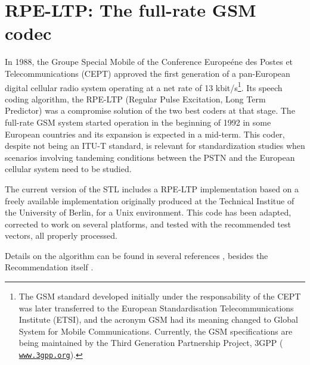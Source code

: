 \chapter{RPE-LTP: The full-rate GSM codec}

In 1988, the Groupe Special Mobile of the Conference Europe\'{e}ne
des Postes et Telecommunications (CEPT) approved the first
generation of a pan-European digital cellular radio system operating
at a net rate of 13 kbit/s\footnote{\SF The GSM standard developed
initially under the responsability of the CEPT was later transferred
to the European Standardisation Telecommunications Institute (ETSI),
and the acronym GSM had its meaning changed to Global System for
Mobile Communications. Currently, the GSM specifications are being
maintained by the Third Generation Partnership Project, 3GPP ({\tt
\url{www.3gpp.org}}).}. Its speech coding algorithm, the RPE-LTP
(Regular Pulse Excitation, Long Term Predictor) was a compromise
solution of the two best coders at that stage. The full-rate GSM
system started operation in the beginning of 1992 in some European
countries and its expansion is expected in a mid-term. This coder,
despite not being an ITU-T standard, is relevant for standardization
studies when scenarios involving tandeming conditions between the
PSTN and the European cellular system need to be studied.

The current version of the STL includes a RPE-LTP implementation
based on a  freely available implementation originally produced at
the Technical Institue of the University of Berlin, for a Unix
environment.  This code has been adapted, corrected to work on
several platforms, and tested with the recommended test vectors, all
properly processed.

Details on the algorithm can be found in several references
\cite{RPELTP:BasicConcept,RPELTP:ICASSP88,RPELTP:SpeechCommunication},
besides the Recommendation itself \cite{GSM-06.10}.


